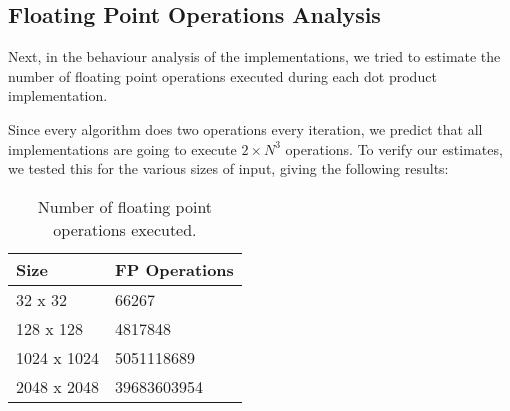 \documentclass[twoside,twocolumn]{article}
\begin{document}
\begin{table}
\centering
{}
\caption{Data transferred to/from the RAM.}
\label{tab:ramtrafficresults}
\end{table}

\subsection{Floating Point Operations Analysis}

Next, in the behaviour analysis of the implementations, we tried to estimate the number of floating point operations executed during each dot product implementation.

Since every algorithm does two operations every iteration, we predict that all implementations are going to execute $2 \times N^{3}$ operations. To verify our estimates, we tested this for the various sizes of input, giving the following results:

\begin{table}[ht]
\centering
\begin{tabular}{|l|l|}
\hline
\textbf{Size} & \textbf{FP Operations} \\ \hline
32 x 32       & 66267                  \\ \hline
128 x 128     & 4817848                \\ \hline
1024 x 1024   & 5051118689             \\ \hline
2048 x 2048   & 39683603954            \\ \hline
\end{tabular}
\caption{Number of floating point operations executed.}
\label{tab:fpresults}
\end{table}
\end{document}
